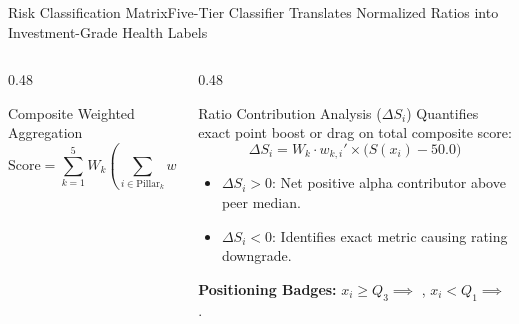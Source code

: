 \begin{frame}{Risk Classification Matrix}{Five-Tier Classifier Translates Normalized Ratios into Investment-Grade Health Labels}
\begin{columns}[T]
\begin{column}{0.48\textwidth}
\begin{tcolorbox}
                \vspace{5pt}
                \begin{mathcard}[height=1.45cm]{Composite Weighted Aggregation}
                    \fontsize{5.8pt}{7.2pt}\selectfont
                    \begin{equation*}
                        \text{Score} = \sum_{k=1}^5 W_k \left( \sum_{i \in \text{Pillar}_k} w_{k,i}' \cdot S(x_i) \right) \in [0, 100]
                    \end{equation*}
                \end{mathcard}
            \end{tcolorbox}
        \end{column}

        \begin{column}{0.48\textwidth}
            \begin{quantcard}[height=2.7cm]{Ratio Contribution Analysis ($\Delta S_i$)}
                \fontsize{6.3pt}{7.9pt}\selectfont
                Quantifies exact point boost or drag on total composite score:
                \begin{equation*}
                    \Delta S_i = W_k \cdot w_{k,i}' \times \big(S(x_i) - 50.0\big)
                \end{equation*}
                \begin{itemize}
                    \setlength{\itemsep}{1.5pt}
                    \item $\Delta S_i > 0$: Net positive alpha contributor above peer median.
                    \item $\Delta S_i < 0$: Identifies exact metric causing rating downgrade.
                \end{itemize}
                \textbf{\color{deepemerald}Positioning Badges:}
                $x_i \ge Q_3 \implies$ , $x_i < Q_1 \implies$ .
            \end{quantcard}

            \vspace{0.1cm}


\end{column}
\end{columns}
\end{frame}
